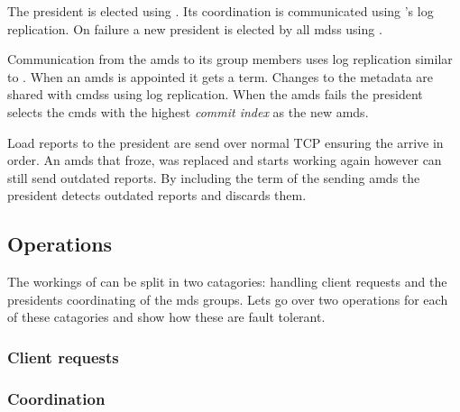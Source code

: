 The president is elected using \raft{}. Its coordination is communicated using \raft{}'s log replication. On failure a new president is elected by all \acp{mds} using \raft{}.

Communication from the \ac{amds} to its group members uses log replication similar to \raft{}. When an \ac{amds} is appointed it gets a \raft{} term. Changes to the metadata are shared with \acp{cmds} using log replication. When the \ac{amds} fails the president selects the \ac{cmds} with the highest \textsl{commit index} as the new \ac{amds}.

Load reports to the president are send over normal TCP ensuring the arrive in order. An \ac{amds} that froze, was replaced and starts working again however can still send outdated reports. By including the term of the sending \ac{amds} the president detects outdated reports and discards them.
%
\subsection{Operations}
The workings of \name{} can be split in two catagories: handling client requests and the presidents coordinating of the \ac{mds} groups. Lets go over two operations for each of these catagories and show how these are fault tolerant.

\subsubsection*{Client requests}

\subsubsection*{Coordination}
